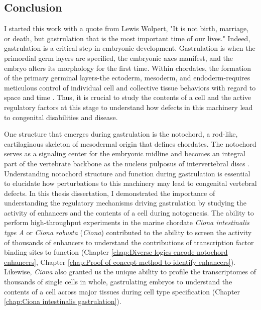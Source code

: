 \begin{dissertationepilogue}
    \section{Conclusion}
    I started this work with a quote from Lewis Wolpert, "It is not birth, marriage, or death, but gastrulation that is the most important time of our lives." Indeed, gastrulation is a critical step in embryonic development. Gastrulation is when the primordial germ layers are specified, the embryonic axes manifest, and the embryo alters its morphology for the first time. Within chordates, the formation of the primary germinal layers-the ectoderm, mesoderm, and endoderm-requires meticulous control of individual cell and collective tissue behaviors with regard to space and time \cite{ghimire2021,balmer2016,winkley2020,solnica-krezel2012}. Thus, it is crucial to study the contents of a cell and the active regulatory factors at this stage to understand how defects in this machinery lead to congenital disabilities and disease. 
    
    One structure that emerges during gastrulation is the notochord, a rod-like, cartilaginous skeleton of mesodermal origin that defines chordates. The notochord serves as a signaling center for the embryonic midline and becomes an integral part of the vertebrate backbone as the nucleus pulposus of intervertebral discs \cite{solnica-krezel2012,balmer2016,debree2018,winkley2020,ghimire2021,stemple2004,stemple2005,choi2008,raj2008a,lawson2015}. Understanding notochord structure and function during gastrulation is essential to elucidate how perturbations to this machinery may lead to congenital vertebral defects. In this thesis dissertation, I demonstrated the importance of understanding the regulatory mechanisms driving gastrulation by studying the activity of enhancers and the contents of a cell during notogenesis. The ability to perform high-throughput experiments in the marine chordate \textit{Ciona intestinalis type A} or \textit{Ciona robusta} (\textit{Ciona}) contributed to the ability to screen the activity of thousands of enhancers to understand the contributions of transcription factor binding sites to function (Chapter \ref{chap:Diverse logics encode notochord enhancers}, Chapter \ref{chap:Proof of concept method to identify enhancers}). Likewise, \textit{Ciona} also granted us the unique ability to profile the transcriptomes of thousands of single cells in whole, gastrulating embryos to understand the contents of a cell across major tissues during cell type specification (Chapter \ref{chap:Ciona intestinalis gastrulation}).


\end{dissertationepilogue}
